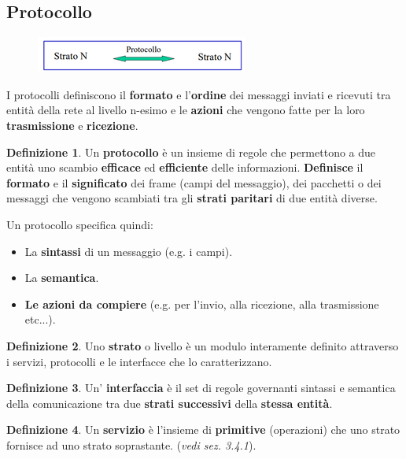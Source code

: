 \documentclass[11pt,a4paper]{article}
\theoremstyle{definition}
\newtheorem{definition}{Definizione}[section]
\begin{document}
\subsection{Protocollo}
\begin{figure}[!h]
	\includegraphics[scale=0.7]{Immagini/Protocollo.png}
	\centering
\end{figure}
I protocolli definiscono il \textbf{formato} e l’\textbf{ordine} dei
messaggi inviati e ricevuti tra entità della rete al livello n-esimo e
le \textbf{azioni} che vengono fatte per la loro \textbf{trasmissione} e
\textbf{ricezione}.
\theoremstyle{definition}
\begin{definition}
	Un \textbf{protocollo} è un insieme di regole che permettono a due entità uno scambio \textbf{efficace} ed \textbf{efficiente} delle informazioni. \textbf{Definisce} il \textbf{formato} e il
	\textbf{significato} dei frame (campi del messaggio), dei pacchetti o dei messaggi
	che vengono scambiati tra gli \textbf{strati paritari} di due
	entità diverse.
\end{definition}
Un protocollo specifica quindi:
\begin{itemize}
	\item La \textbf{sintassi} di un messaggio (e.g. i campi).
	\item La \textbf{semantica}.
	\item  \textbf{Le azioni da compiere }(e.g. per l'invio, alla ricezione, alla trasmissione etc...).
\end{itemize}
\theoremstyle{definition}
\begin{definition}
	Uno \textbf{strato} o livello è un modulo interamente definito attraverso i
	servizi, protocolli e le interfacce che lo caratterizzano.
\end{definition}
\theoremstyle{definition}
\begin{definition}
	Un' \textbf{interfaccia} è il set di regole governanti sintassi e semantica della comunicazione tra due \textbf{strati successivi} della \textbf{stessa entità}.
\end{definition}
\theoremstyle{definition}
\begin{definition}
	Un \textbf{servizio} è l'insieme di \textbf{primitive} (operazioni) che uno strato
	fornisce ad uno strato soprastante. (\textit{vedi sez. 3.4.1}).
\end{definition}
\end{document}
